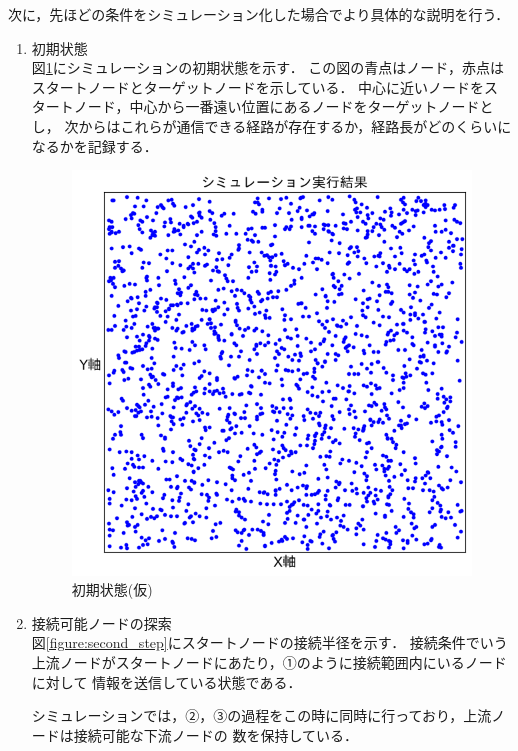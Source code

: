 \documentclass[a4paper, 11pt]{ltjsarticle}
\begin{document}
次に，先ほどの条件をシミュレーション化した場合でより具体的な説明を行う．

\begin{enumerate}[label=\textbf{(\arabic*)}]
  \item 初期状態 \\
        図\ref{figure:first_step}にシミュレーションの初期状態を示す．
        この図の青点はノード，赤点はスタートノードとターゲットノードを示している．
        中心に近いノードをスタートノード，中心から一番遠い位置にあるノードをターゲットノードとし，
        次からはこれらが通信できる経路が存在するか，経路長がどのくらいになるかを記録する．
        
        \begin{figure}[H]
          \centering
          \includegraphics[width=130mm]{first_step.png}
          \caption{初期状態(仮)}
          \label{figure:first_step}
        \end{figure}
  \clearpage
  \item 接続可能ノードの探索 \\
        図\ref{figure:second_step}にスタートノードの接続半径を示す．
        接続条件でいう上流ノードがスタートノードにあたり，①のように接続範囲内にいるノードに対して
        情報を送信している状態である．
        
        シミュレーションでは，②，③の過程をこの時に同時に行っており，上流ノードは接続可能な下流ノードの
        数を保持している．


\end{enumerate}
\end{document}
